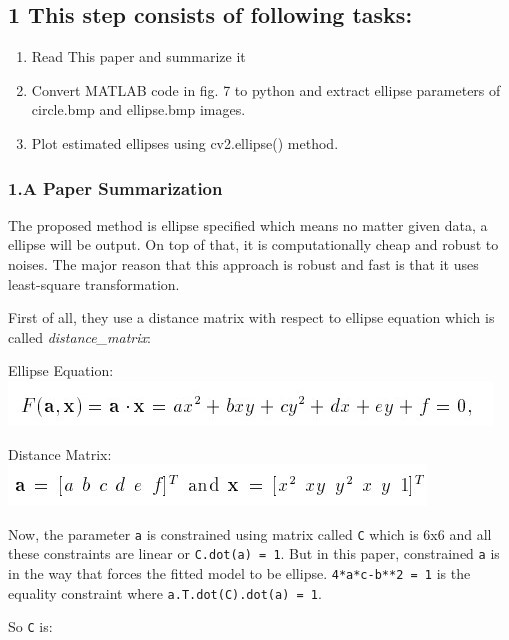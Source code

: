 \documentclass[11pt]{article}
\makeatletter
\def\maxwidth{\ifdim\Gin@nat@width>\linewidth\linewidth
    \else\Gin@nat@width\fi}
\let\Oldincludegraphics\includegraphics
\renewcommand{\includegraphics}[1]{\Oldincludegraphics[width=.8\maxwidth]{#1}}
\providecommand{\tightlist}{%
      \setlength{\itemsep}{0pt}\setlength{\parskip}{0pt}}
\makeatother
\begin{document}
    \hypertarget{this-step-consists-of-following-tasks}{%
\subsection{1 This step consists of following
tasks:}\label{this-step-consists-of-following-tasks}}

\begin{enumerate}
\def\labelenumi{\arabic{enumi}.}
\tightlist
\item
  Read This paper and summarize it
\item
  Convert MATLAB code in fig. 7 to python and extract ellipse parameters
  of circle.bmp and ellipse.bmp images.
\item
  Plot estimated ellipses using cv2.ellipse() method.
\end{enumerate}

    \hypertarget{a-paper-summarization}{%
\subsubsection{1.A Paper Summarization}\label{a-paper-summarization}}

The proposed method is ellipse specified which means no matter given
data, a ellipse will be output. On top of that, it is computationally
cheap and robust to noises. The major reason that this approach is
robust and fast is that it uses least-square transformation.

First of all, they use a distance matrix with respect to ellipse
equation which is called \emph{distance\_matrix}:

Ellipse Equation: \includegraphics{wiki/eq.jpg}

Distance Matrix: \includegraphics{wiki/dm.jpg}

Now, the parameter \texttt{a} is constrained using matrix called
\texttt{C} which is 6x6 and all these constraints are linear or
\texttt{C.dot(a)\ =\ 1}. But in this paper, constrained \texttt{a} is in
the way that forces the fitted model to be ellipse.
\texttt{4*a*c-b**2\ =\ 1} is the equality constraint where
\texttt{a.T.dot(C).dot(a)\ =\ 1}.

So \texttt{C} is:
\end{document}
